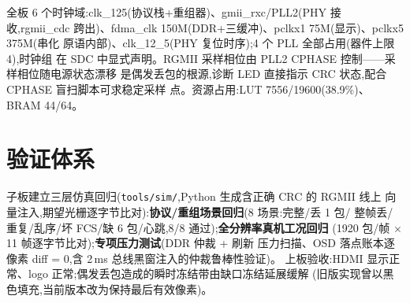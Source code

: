 全板 6 个时钟域:clk\_125(协议栈+重组器)、gmii\_rxc/PLL2(PHY 接收,rgmii\_cdc
跨出)、fdma\_clk 150M(DDR+三缓冲)、pclkx1 75M(显示)、pclkx5 375M(串化
原语内部)、clk\_12\_5(PHY 复位时序);4 个 PLL 全部占用(器件上限 4),时钟组
在 SDC 中显式声明。RGMII 采样相位由 PLL2 CPHASE 控制——采样相位随电源状态漂移
是偶发丢包的根源,诊断 LED 直接指示 CRC 状态,配合 CPHASE 盲扫脚本可求稳定采样
点。资源占用:LUT 7556/19600(38.9\%)、BRAM 44/64。

\section{验证体系}

子板建立三层仿真回归(\verb|tools/sim/|,Python 生成含正确 CRC 的 RGMII 线上
向量注入,期望光栅逐字节比对):\textbf{协议/重组场景回归}(8 场景:完整/丢 1 包/
整帧丢/重复/乱序/坏 FCS/缺 6 包/心跳,8/8 通过);\textbf{全分辨率真机工况回归}
(1920 包/帧 $\times$ 11 帧逐字节比对);\textbf{专项压力测试}(DDR 仲裁 + 刷新
压力扫描、OSD 落点账本逐像素 diff = 0,含 2\,ms 总线黑窗注入的仲裁鲁棒性验证)。
上板验收:HDMI 显示正常、logo 正常;偶发丢包造成的瞬时冻结带由缺口冻结延展缓解
(旧版实现曾以黑色填充,当前版本改为保持最后有效像素)。
